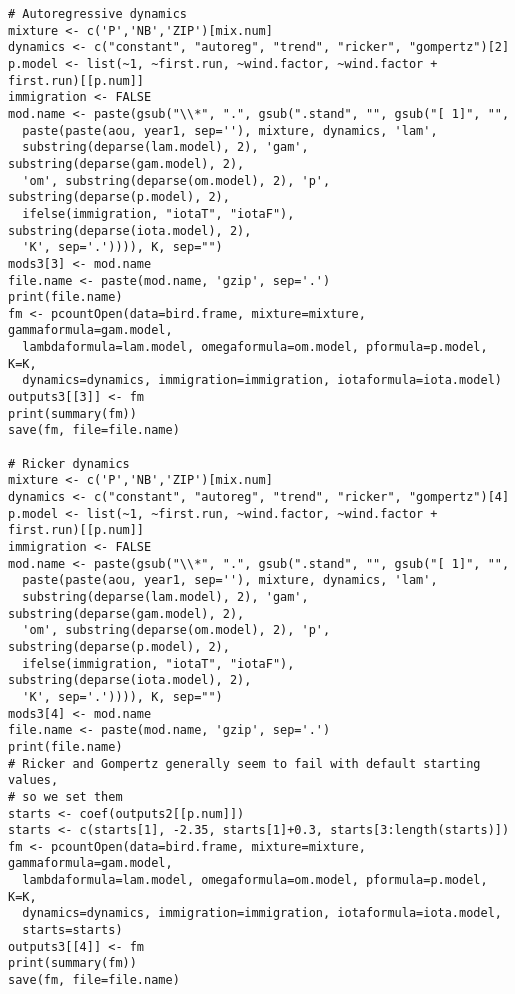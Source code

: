 \documentclass[12pt]{article}
\begin{document}
\begin{verbatim}
# Autoregressive dynamics
mixture <- c('P','NB','ZIP')[mix.num]
dynamics <- c("constant", "autoreg", "trend", "ricker", "gompertz")[2]
p.model <- list(~1, ~first.run, ~wind.factor, ~wind.factor + first.run)[[p.num]]
immigration <- FALSE
mod.name <- paste(gsub("\\*", ".", gsub(".stand", "", gsub("[ 1]", "", 
  paste(paste(aou, year1, sep=''), mixture, dynamics, 'lam', 
  substring(deparse(lam.model), 2), 'gam', substring(deparse(gam.model), 2), 
  'om', substring(deparse(om.model), 2), 'p', substring(deparse(p.model), 2), 
  ifelse(immigration, "iotaT", "iotaF"), substring(deparse(iota.model), 2),
  'K', sep='.')))), K, sep="")
mods3[3] <- mod.name
file.name <- paste(mod.name, 'gzip', sep='.')
print(file.name)
fm <- pcountOpen(data=bird.frame, mixture=mixture, gammaformula=gam.model, 
  lambdaformula=lam.model, omegaformula=om.model, pformula=p.model, K=K, 
  dynamics=dynamics, immigration=immigration, iotaformula=iota.model)
outputs3[[3]] <- fm
print(summary(fm))
save(fm, file=file.name)

# Ricker dynamics
mixture <- c('P','NB','ZIP')[mix.num]
dynamics <- c("constant", "autoreg", "trend", "ricker", "gompertz")[4]
p.model <- list(~1, ~first.run, ~wind.factor, ~wind.factor + first.run)[[p.num]]
immigration <- FALSE
mod.name <- paste(gsub("\\*", ".", gsub(".stand", "", gsub("[ 1]", "", 
  paste(paste(aou, year1, sep=''), mixture, dynamics, 'lam', 
  substring(deparse(lam.model), 2), 'gam', substring(deparse(gam.model), 2), 
  'om', substring(deparse(om.model), 2), 'p', substring(deparse(p.model), 2), 
  ifelse(immigration, "iotaT", "iotaF"), substring(deparse(iota.model), 2),
  'K', sep='.')))), K, sep="")
mods3[4] <- mod.name
file.name <- paste(mod.name, 'gzip', sep='.')
print(file.name)
# Ricker and Gompertz generally seem to fail with default starting values, 
# so we set them
starts <- coef(outputs2[[p.num]])
starts <- c(starts[1], -2.35, starts[1]+0.3, starts[3:length(starts)])
fm <- pcountOpen(data=bird.frame, mixture=mixture, gammaformula=gam.model, 
  lambdaformula=lam.model, omegaformula=om.model, pformula=p.model, K=K, 
  dynamics=dynamics, immigration=immigration, iotaformula=iota.model, 
  starts=starts)
outputs3[[4]] <- fm
print(summary(fm))
save(fm, file=file.name)


\end{verbatim}
\end{document}
